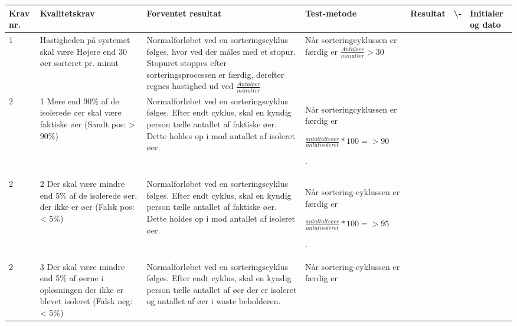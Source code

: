 \begin{center}
		\begin{longtable}{ | m{1.785cm} | m{1.785cm}| m{1.785cm}| m{1.785cm}| m{1.785cm}| m{1.785cm}|m{1.785cm}| } 
			\hline
			\textbf{Krav nr.} &\textbf{ Kvalitetskrav} & \textbf{Forventet resultat} & \textbf{Test-metode} &\textbf{Resultat} & \textbf{ \checkmark \textbackslash -} & \textbf{Initialer og dato} \\ 
			
			\hline
			1 &  Hastigheden på systemet skal være Højere end 30 øer sorteret pr. minut & Normalforløbet ved en sorteringscyklus følges\fxnote{indsæt ref til UC}, hvor ved der måles med et stopur. Stopuret stoppes efter sorteringsprocessen er færdig, derefter regnes hastighed ud ved 
$\frac{Antal øer}{minutter}$			
			
			\fxnote{hmm} & Når sorteringcyklussen er færdig er
			$\frac{Antal øer}{minutter}>30$
 &  & & \\
			\hline
			
			2 &  1 Mere end 90\% af de isolerede øer skal være faktiske øer 
(Sandt pos: > 90\%)
 & Normalforløbet ved en sorteringscyklus følges. Efter endt cyklus, skal en kyndig person tælle antallet af faktiske øer. Dette holdes op i mod antallet af isoleret øer. & Når sorteringcyklussen er færdig er

 $\frac{antal talte øer}{antal isoleret}*100=>90$


.   &  & & \\
			\hline
			
			2 &  2 Der skal være mindre end 5\% af de isolerede øer, der ikke er øer
(Falsk pos: < 5\%)
 & Normalforløbet ved en sorteringscyklus følges. Efter endt cyklus, skal en kyndig person tælle antallet af faktiske øer. Dette holdes op i mod antallet af isoleret øer.  & Når sortering-cyklussen er færdig er

$\frac{antal talte øer}{antal isoleret}*100=>95$


.   &  & & \\

			\hline
2 &  3 Der skal være mindre end 5\% af øerne i opløsningen der ikke er blevet isoleret
(Falsk neg: < 5\%)

 & Normalforløbet ved en sorteringscyklus følges. Efter endt cyklus, skal en kyndig person tælle antallet af øer der er isoleret og antallet af øer i waste beholderen.  & Når sortering-cyklussen er færdig er


\end{longtable}
\end{center}
